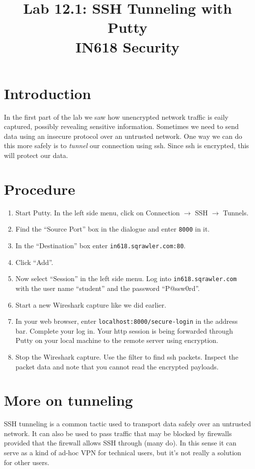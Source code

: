 \documentclass{article}
\begin{document}
\title{ Lab 12.1: SSH Tunneling with Putty  \\ IN618 Security}
\maketitle

\section*{Introduction}
In the first part of the lab we saw how unencrypted network traffic is eaily captured, possibly revealing sensitive information. Sometimes we need to send data using an insecure protocol over an untrusted network.  One way we can do this more safely is to \emph{tunnel} our connection using ssh.  Since ssh is encrypted, this will protect our data.


\section{Procedure}
\begin{enumerate}
	\item Start Putty. In the left side menu, click on Connection $\rightarrow$ SSH $\rightarrow$ Tunnels.
	\item Find the ``Source Port'' box in the dialogue and enter \texttt{8000} in it.
	\item In the ``Destination'' box enter \texttt{in618.sqrawler.com:80}.
	\item Click ``Add''.
	\item Now select ``Session'' in the left side menu.  Log into \texttt{in618.sqrawler.com} with the user name ``student'' and the password ``P@ssw0rd''.
	\item Start a new Wireshark capture like we did earlier.
	\item In your web browser, enter \texttt{localhost:8000/secure-login} in the address bar.  Complete your log in. Your http session is being forwarded through Putty on your local machine to the remote server using encryption.
	\item Stop the Wireshark capture.  Use the filter to find ssh packets.  Inspect the packet data and note that you cannot read the encrypted payloads.
\end{enumerate}


\section{More on tunneling}
SSH tunneling is a common tactic used to transport data safely over an untrusted network.  It can also be used to pass traffic that may be blocked by firewalls provided that the firewall allows SSH through (many do).  In this sense it can serve as a kind of ad-hoc VPN for technical users, but it's not really a solution for other users.
\end{document}
